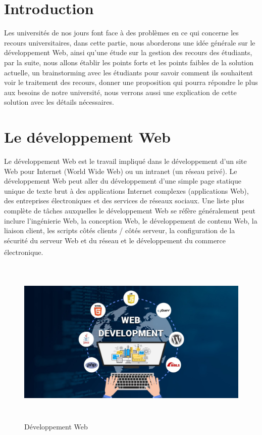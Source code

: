 \documentclass[12pt]{report}
\begin{document}
\section{Introduction}
\vspace{0.2in}
Les universités de nos jours font face à des problèmes en ce qui concerne les recours universitaires, dans cette partie, nous aborderons une idée générale sur le développement Web, ainsi qu'une étude sur la gestion des recours des étudiants, par la suite, nous allons établir les points forts et les points faibles de la solution actuelle, un brainstorming avec les étudiants pour savoir comment ils souhaitent voir le traitement des recours, donner une proposition  qui pourra répondre le plus aux besoins de notre université, nous verrons aussi une explication de cette solution avec les détails nécessaires.


\section{Le développement Web}
\vspace{0.2in}
Le développement Web est le travail impliqué dans le développement d'un site Web pour Internet (World Wide Web) ou un intranet (un réseau privé). Le développement Web peut aller du développement d'une simple page statique unique de texte brut à des applications Internet complexes (applications Web), des entreprises électroniques et des services de réseaux sociaux. Une liste plus complète de tâches auxquelles le développement Web se réfère généralement peut inclure l'ingénierie Web, la conception Web, le développement de contenu Web, la liaison client, les scripts côtés clients / côtés serveur, la configuration de la sécurité du serveur Web et du réseau et le développement du commerce électronique.\textsuperscript{\cite{berners2001semantic}}

\vspace{0.3in}

\begin{figure}[h]
\centering
    \includegraphics[width = 6in, height = 3.2in]{../Images/webDev.jpeg}
\caption{Développement Web}
\end{figure}
\end{document}
